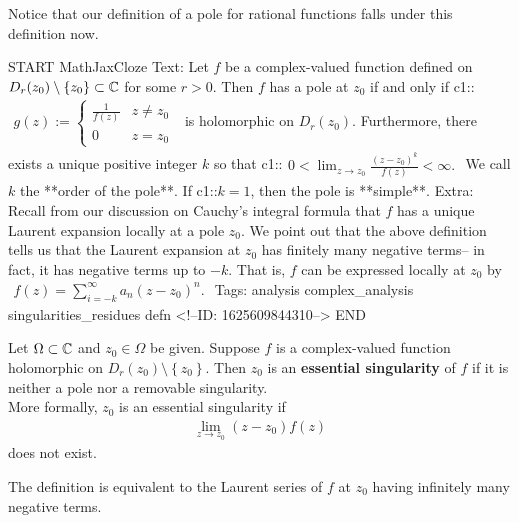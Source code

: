 \documentclass{memoir}
\begin{document}
Notice that our definition of a pole for rational functions falls under this definition now.

\begin{anki}
START
MathJaxCloze
Text: Let \(f\) be a complex-valued function defined on \(D_r(z_0)\setminus \left\{ z_0 \right\} \subset \mathbb{C}\) for some \(r>0\). Then \(f\) has a pole at \(z_0\) if and only if
 {{c1::\(\begin{align*}
        	g(z) := \begin{cases}
        		\frac{1}{f(z)} & z\neq z_0\\
        		0 & z=z_0
        	\end{cases}
        \end{align*}\)}} 
	is holomorphic on \(D_r(z_0)\). Furthermore, there exists a unique positive integer \(k\) so that
	{{c1::\(\begin{align*}
	        	0 < \lim_{z \to z_0} \frac{(z-z_0)^{k}}{f(z)}< \infty.
	        \end{align*}\)}} 
We call \(k\) the **order of the pole**. If {{c1::\(k=1\)}}, then the pole is **simple**.
Extra: Recall from our discussion on Cauchy's integral formula that \(f\) has a unique Laurent expansion locally at a pole \(z_0\). We point out that the above definition tells us that the Laurent expansion at \(z_0\) has finitely many negative terms-- in fact, it has negative terms up to \(-k\). That is, \(f\) can be expressed locally at \(z_0\) by
\(\begin{align*}
  	f(z) = \sum_{i=-k}^{\infty} a_n (z-z_0)^{n}.
  \end{align*}\)
Tags: analysis complex_analysis singularities_residues defn
<!--ID: 1625609844310-->
END
\end{anki}

\begin{defn}
	Let \(\Omega \subset \mathbb{C}\) and \(z_0 \in \Omega \) be given. Suppose \(f\) is a complex-valued function holomorphic on \(D_r(z_0) \setminus\left\{ z_0 \right\} \). Then \(z_0\) is an \textbf{essential singularity} of \(f\) if it is neither a pole nor a removable singularity.\\

	More formally, \(z_0\) is an essential singularity if
	\begin{align*}
		\lim_{z \to z_0} (z-z_0)f(z)
	\end{align*}
	does not exist.
\end{defn}
The definition is equivalent to the Laurent series of \(f\) at \(z_0\) having infinitely many negative terms.
\end{document}
